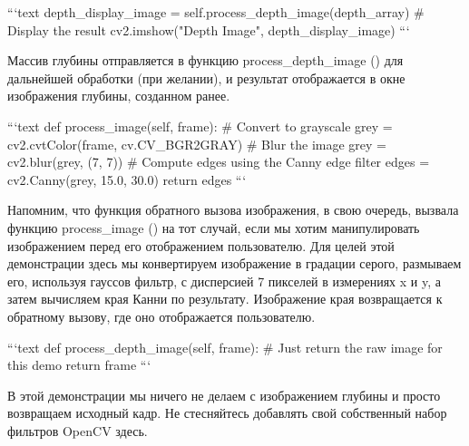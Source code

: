 ```text
depth_display_image = self.process_depth_image(depth_array)
# Display the result
cv2.imshow("Depth Image", depth_display_image)
```

Массив глубины отправляется в функцию process\_depth\_image () для дальнейшей обработки (при желании), и результат отображается в окне изображения глубины, созданном ранее.

```text
def process_image(self, frame):
# Convert to grayscale
grey = cv2.cvtColor(frame, cv.CV_BGR2GRAY)
# Blur the image
grey = cv2.blur(grey, (7, 7))
# Compute edges using the Canny edge filter
edges = cv2.Canny(grey, 15.0, 30.0)
return edges
```

Напомним, что функция обратного вызова изображения, в свою очередь, вызвала функцию process\_image () на тот случай, если мы хотим манипулировать изображением перед его отображением пользователю. Для целей этой демонстрации здесь мы конвертируем изображение в градации серого, размываем его, используя гауссов фильтр, с дисперсией 7 пикселей в измерениях x и y, а затем вычисляем края Канни по результату. Изображение края возвращается к обратному вызову, где оно отображается пользователю.

```text
def process_depth_image(self, frame):
# Just return the raw image for this demo return frame
```

В этой демонстрации мы ничего не делаем с изображением глубины и просто возвращаем исходный кадр. Не стесняйтесь добавлять свой собственный набор фильтров OpenCV здесь.

